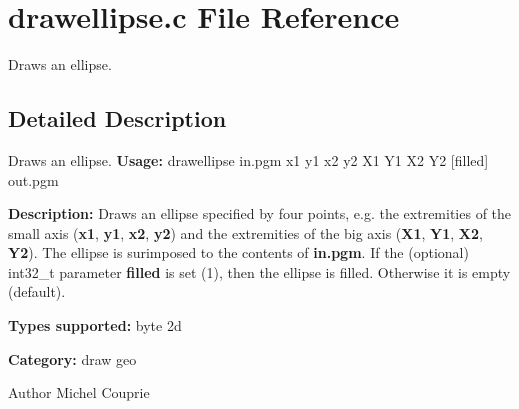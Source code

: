 \section{drawellipse.c File Reference}
\label{drawellipse_8c}


Draws an ellipse.  




\subsection{Detailed Description}
Draws an ellipse. {\bfseries Usage:} drawellipse in.pgm x1 y1 x2 y2 X1 Y1 X2 Y2 [filled] out.pgm

{\bfseries Description:} Draws an ellipse specified by four points, e.g. the extremities of the small axis ({\bfseries x1}, {\bfseries y1}, {\bfseries x2}, {\bfseries y2}) and the extremities of the big axis ({\bfseries X1}, {\bfseries Y1}, {\bfseries X2}, {\bfseries Y2}). The ellipse is surimposed to the contents of {\bfseries in.pgm}. If the (optional) int32\_\-t parameter {\bfseries filled} is set (1), then the ellipse is filled. Otherwise it is empty (default).

{\bfseries Types supported:} byte 2d

{\bfseries Category:} draw geo

\begin{DoxyAuthor}{Author}
Michel Couprie 
\end{DoxyAuthor}
